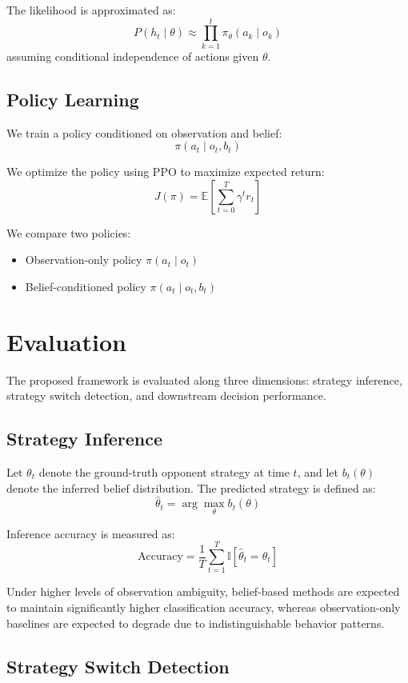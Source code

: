 \documentclass{article}
\begin{document}
The likelihood is approximated as:
\[
P(h_t \mid \theta) \approx \prod_{k=1}^{t} \pi_\theta(a_k \mid o_k)
\]
assuming conditional independence of actions given $\theta$.

\subsection{Policy Learning}

We train a policy conditioned on observation and belief:
\[
\pi(a_t \mid o_t, b_t)
\]

We optimize the policy using PPO to maximize expected return:
\[
J(\pi) = \mathbb{E}\left[\sum_{t=0}^{T} \gamma^t r_t\right]
\]

We compare two policies:
\begin{itemize}
    \item Observation-only policy $\pi(a_t \mid o_t)$
    \item Belief-conditioned policy $\pi(a_t \mid o_t, b_t)$
\end{itemize}

\section{Evaluation}

The proposed framework is evaluated along three dimensions: strategy inference, strategy switch detection, and downstream decision performance.

\subsection{Strategy Inference}

Let $\theta_t$ denote the ground-truth opponent strategy at time $t$, and let $b_t(\theta)$ denote the inferred belief distribution. The predicted strategy is defined as:
\[
\hat{\theta}_t = \arg\max_{\theta} b_t(\theta)
\]

Inference accuracy is measured as:
\[
\text{Accuracy} = \frac{1}{T} \sum_{t=1}^{T} \mathbb{I}[\hat{\theta}_t = \theta_t]
\]

Under higher levels of observation ambiguity, belief-based methods are expected to maintain significantly higher classification accuracy, whereas observation-only baselines are expected to degrade due to indistinguishable behavior patterns.

\subsection{Strategy Switch Detection}
\end{document}
